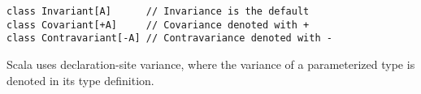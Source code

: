 \begin{algorithm}

\begin{verbatim}
class Invariant[A]      // Invariance is the default
class Covariant[+A]     // Covariance denoted with +
class Contravariant[-A] // Contravariance denoted with -
\end{verbatim}

\caption{Scala uses declaration-site variance, where the variance of a parameterized type is denoted in its type definition. \label{declaration-site-variance}}
\end{algorithm}
